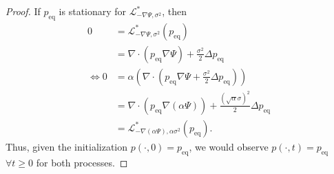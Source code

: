\documentclass[twoside]{article}
\newcommand{\R} {\mathbb R}
\newcommand{\dx}{\mathrm{d}x}
\begin{document}
\begin{proof}


If $p_\mathrm{eq}$ is stationary for $\mathcal{L}^*_{-\nabla\Psi, \sigma^2}$, then
\begin{align*}
    0 &= \mathcal{L}^*_{-\nabla\Psi, \sigma^2}(p_\mathrm{eq})\\
    &= \nabla \cdot (p_\mathrm{eq} \nabla \Psi)+ \frac{\sigma^2}{2} \Delta p_\mathrm{eq}
    \\\Leftrightarrow
    0 &= \alpha\left(\nabla \cdot (p_\mathrm{eq} \nabla \Psi + \frac{\sigma^2}{2} \Delta p_\mathrm{eq})\right)\\
    &= \nabla \cdot (p_\mathrm{eq}\nabla(\alpha\Psi)) + \frac{(\sqrt{\alpha}\sigma)^2}{2} \Delta p_\mathrm{eq}
    \\&= \mathcal{L}^*_{-\nabla(\alpha\Psi), \alpha\sigma^2}(p_\mathrm{eq}).
\end{align*}
Thus, given the initialization $p(\cdot,0)=p_\mathrm{eq}$, we would observe $p(\cdot,t)=p_\mathrm{eq}$ $\forall t \ge 0$ for both processes.
\end{proof}


\end{document}
